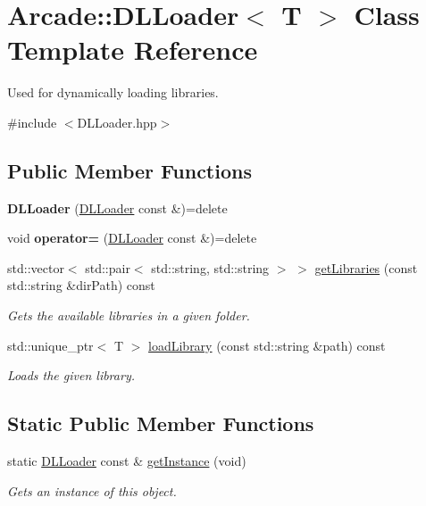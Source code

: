 \hypertarget{classArcade_1_1DLLoader}{}\section{Arcade\+::D\+L\+Loader$<$ T $>$ Class Template Reference}
\label{classArcade_1_1DLLoader}


Used for dynamically loading libraries.  




{\ttfamily \#include $<$D\+L\+Loader.\+hpp$>$}

\subsection*{Public Member Functions}
\begin{DoxyCompactItemize}
\item 
\mbox{\label{classArcade_1_1DLLoader_ae3bd52e8aff2d1009f0eeb169d18290a}} 
{\bfseries D\+L\+Loader} (\mbox{\hyperlink{classArcade_1_1DLLoader}{D\+L\+Loader}} const \&)=delete
\item 
\mbox{\label{classArcade_1_1DLLoader_a7669292663e67263a50cfa36be22c5d7}} 
void {\bfseries operator=} (\mbox{\hyperlink{classArcade_1_1DLLoader}{D\+L\+Loader}} const \&)=delete
\item 
std\+::vector$<$ std\+::pair$<$ std\+::string, std\+::string $>$ $>$ \mbox{\hyperlink{classArcade_1_1DLLoader_ab2d8182befd3ba3dc59cb0c308046de8}{get\+Libraries}} (const std\+::string \&dir\+Path) const
\begin{DoxyCompactList}\small\item\em Gets the available libraries in a given folder. \end{DoxyCompactList}\item 
std\+::unique\+\_\+ptr$<$ T $>$ \mbox{\hyperlink{classArcade_1_1DLLoader_ad9fb1241a01190637402f3866c695272}{load\+Library}} (const std\+::string \&path) const
\begin{DoxyCompactList}\small\item\em Loads the given library. \end{DoxyCompactList}\end{DoxyCompactItemize}
\subsection*{Static Public Member Functions}
\begin{DoxyCompactItemize}
\item 
static \mbox{\hyperlink{classArcade_1_1DLLoader}{D\+L\+Loader}} const  \& \mbox{\hyperlink{classArcade_1_1DLLoader_a7a75048aa067e9e75aaf5faae6cfa4c1}{get\+Instance}} (void)
\begin{DoxyCompactList}\small\item\em Gets an instance of this object. \end{DoxyCompactList}\end{DoxyCompactItemize}


